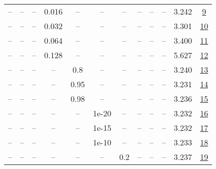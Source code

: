 \begin{table}[H]
\begin{tabular}{cccccccccccc}
-- & -- & -- & 0.016 & -- & -- & -- & -- & -- & -- & 3.242 & \href{https://wandb.ai/stanford-mercury/optimizer-scaling/runs/sweep-300m-6B-sciond859faelr0.016-wd0.1-minlr0-warmup0-b10.98-gn-e582af}{9} \\
-- & -- & -- & 0.032 & -- & -- & -- & -- & -- & -- & 3.301 & \href{https://wandb.ai/stanford-mercury/optimizer-scaling/runs/sweep-300m-6B-sciond99bb86lr0.032-wd0.1-minlr0-warmup0-b10.98-gn-1251a1}{10} \\
-- & -- & -- & 0.064 & -- & -- & -- & -- & -- & -- & 3.400 & \href{https://wandb.ai/stanford-mercury/optimizer-scaling/runs/sweep-300m-6B-sciond92cc85lr0.064-wd0.1-minlr0-warmup0-b10.98-gn-c0733d}{11} \\
-- & -- & -- & 0.128 & -- & -- & -- & -- & -- & -- & 5.627 & \href{https://wandb.ai/stanford-mercury/optimizer-scaling/runs/sweep-300m-6B-sciond02a6a1lr0.128-wd0.1-minlr0-warmup0-b10.98-gn-465361}{12} \\
-- & -- & -- & -- & 0.8 & -- & -- & -- & -- & -- & 3.240 & \href{https://wandb.ai/stanford-mercury/optimizer-scaling/runs/sweep-300m-6B-sciondb93cablr0.008-wd0.1-minlr0-warmup0-b10.98-gn-7a2ff9}{13} \\
-- & -- & -- & -- & 0.95 & -- & -- & -- & -- & -- & 3.231 & \href{https://wandb.ai/stanford-mercury/optimizer-scaling/runs/sweep-300m-6B-sciond26da5flr0.008-wd0.1-minlr0-warmup0-b10.98-gn-4234e5}{14} \\
-- & -- & -- & -- & 0.98 & -- & -- & -- & -- & -- & 3.236 & \href{https://wandb.ai/stanford-mercury/optimizer-scaling/runs/sweep-300m-6B-sciondba6c4clr0.008-wd0.1-minlr0-warmup0-b10.98-gn-60d1af}{15} \\
-- & -- & -- & -- & -- & 1e-20 & -- & -- & -- & -- & 3.232 & \href{https://wandb.ai/stanford-mercury/optimizer-scaling/runs/sweep-300m-6B-sciond2cd962lr0.008-wd0.1-minlr0-warmup0-b10.98-gn-9ae6b3}{16} \\
-- & -- & -- & -- & -- & 1e-15 & -- & -- & -- & -- & 3.232 & \href{https://wandb.ai/stanford-mercury/optimizer-scaling/runs/sweep-300m-6B-sciond1c6c6alr0.008-wd0.1-minlr0-warmup0-b10.98-gn-39d488}{17} \\
-- & -- & -- & -- & -- & 1e-10 & -- & -- & -- & -- & 3.233 & \href{https://wandb.ai/stanford-mercury/optimizer-scaling/runs/sweep-300m-6B-sciondbedd5alr0.008-wd0.1-minlr0-warmup0-b10.98-gn-03c420}{18} \\
-- & -- & -- & -- & -- & -- & 0.2 & -- & -- & -- & 3.237 & \href{https://wandb.ai/stanford-mercury/optimizer-scaling/runs/sweep-300m-6B-scionfa9d01lr0.008-wd0.1-minlr0-warmup0-b10.98-gn2-d33d38}{19} \\

\end{tabular}
\end{table}
